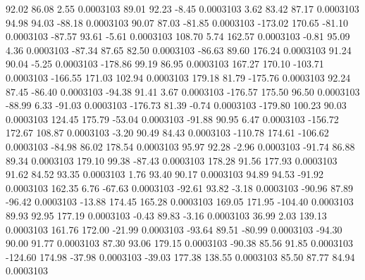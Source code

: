        92.02       86.08        2.55     0.0003103
       89.01       92.23       -8.45     0.0003103
        3.62       83.42       87.17     0.0003103
       94.98       94.03      -88.18     0.0003103
       90.07       87.03      -81.85     0.0003103
     -173.02      170.65      -81.10     0.0003103
      -87.57       93.61       -5.61     0.0003103
      108.70        5.74      162.57     0.0003103
       -0.81       95.09        4.36     0.0003103
      -87.34       87.65       82.50     0.0003103
      -86.63       89.60      176.24     0.0003103
       91.24       90.04       -5.25     0.0003103
     -178.86       99.19       86.95     0.0003103
      167.27      170.10     -103.71     0.0003103
     -166.55      171.03      102.94     0.0003103
      179.18       81.79     -175.76     0.0003103
       92.24       87.45      -86.40     0.0003103
      -94.38       91.41        3.67     0.0003103
     -176.57      175.50       96.50     0.0003103
      -88.99        6.33      -91.03     0.0003103
     -176.73       81.39       -0.74     0.0003103
     -179.80      100.23       90.03     0.0003103
      124.45      175.79      -53.04     0.0003103
      -91.88       90.95        6.47     0.0003103
     -156.72      172.67      108.87     0.0003103
       -3.20       90.49       84.43     0.0003103
     -110.78      174.61     -106.62     0.0003103
      -84.98       86.02      178.54     0.0003103
       95.97       92.28       -2.96     0.0003103
      -91.74       86.88       89.34     0.0003103
      179.10       99.38      -87.43     0.0003103
      178.28       91.56      177.93     0.0003103
       91.62       84.52       93.35     0.0003103
        1.76       93.40       90.17     0.0003103
       94.89       94.53      -91.92     0.0003103
      162.35        6.76      -67.63     0.0003103
      -92.61       93.82       -3.18     0.0003103
      -90.96       87.89      -96.42     0.0003103
      -13.88      174.45      165.28     0.0003103
      169.05      171.95     -104.40     0.0003103
       89.93       92.95      177.19     0.0003103
       -0.43       89.83       -3.16     0.0003103
       36.99        2.03      139.13     0.0003103
      161.76      172.00      -21.99     0.0003103
      -93.64       89.51      -80.99     0.0003103
      -94.30       90.00       91.77     0.0003103
       87.30       93.06      179.15     0.0003103
      -90.38       85.56       91.85     0.0003103
     -124.60      174.98      -37.98     0.0003103
      -39.03      177.38      138.55     0.0003103
       85.50       87.77       84.94     0.0003103
